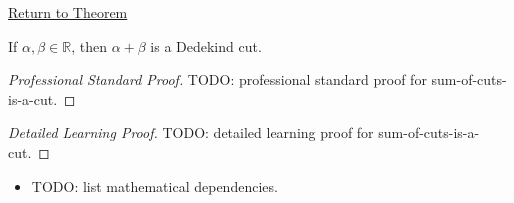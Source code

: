\newpage
{}
\label{prf:sum-of-cuts-is-a-cut}

\begin{remark*}[Return]
\hyperref[lem:sum-of-cuts-is-a-cut]{Return to Theorem}
\end{remark*}

\begin{lemma*}
If $\alpha,\beta\in\mathbb{R}$, then $\alpha+\beta$ is a Dedekind cut.
\end{lemma*}

\begin{proof}[Professional Standard Proof]
\LRAProofBodyStart
TODO: professional standard proof for sum-of-cuts-is-a-cut.
\end{proof}

\begin{proof}[Detailed Learning Proof]
\LRAProofBodyStart
TODO: detailed learning proof for sum-of-cuts-is-a-cut.
\end{proof}

\begin{remark*}
\end{remark*}

\begin{dependencies}
\begin{itemize}
  \item TODO: list mathematical dependencies.
\end{itemize}
\end{dependencies}

\clearpage
